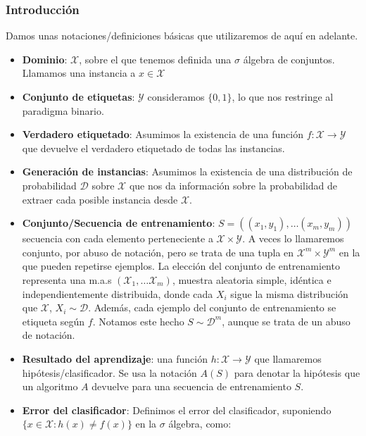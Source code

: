 \subsubsection{Introducción}

Damos unas notaciones/definiciones básicas que utilizaremos de aquí en adelante.

\begin{itemize}
\item \textbf{Dominio}: $\mathcal{X}$, sobre el que tenemos definida una $\sigma$ álgebra de conjuntos. Llamamos una instancia a $x\in \mathcal{X}$
\item \textbf{Conjunto de etiquetas}: $\mathcal{Y}$ consideramos $\{0,1\}$, lo que nos restringe al paradigma binario.
\item \textbf{Verdadero etiquetado}: Asumimos la existencia de una función $f: \mathcal{X} \rightarrow \mathcal{Y}$ que devuelve el verdadero etiquetado de todas las instancias.
\item \textbf{Generación de instancias}: Asumimos la existencia de una distribución de probabilidad $\mathcal{D}$ sobre $\mathcal{X}$ que nos da información sobre la probabilidad de extraer cada posible instancia desde $\mathcal{X}$.
\item \textbf{Conjunto/Secuencia de entrenamiento}: $S = ((x_1,y_1), \ldots (x_m, y_m))$ secuencia con cada elemento perteneciente a $\mathcal{X}\times \mathcal{Y}$. A veces lo llamaremos conjunto, por abuso de notación, pero se trata de una tupla en $\mathcal{X}^m \times \mathcal{Y}^m$ en la que pueden repetirse ejemplos. La elección del conjunto de entrenamiento representa una m.a.s $(\mathcal{X}_1,\ldots \mathcal{X}_m)$, muestra aleatoria simple, idéntica e independientemente distribuida, donde cada $X_i$ sigue la misma distribución que $\mathcal{X}$, $X_i \sim \mathcal{D}$. Además, cada ejemplo del conjunto de entrenamiento se etiqueta según $f$. Notamos este hecho $S \sim \mathcal{D}^m$, aunque se trata de un abuso de notación.
\item \textbf{Resultado del aprendizaje}: una función $h: \mathcal{X} \rightarrow \mathcal{Y}$ que llamaremos hipótesis/clasificador. Se usa la notación $A(S)$ para denotar la hipótesis que un algoritmo $A$ devuelve para una secuencia de entrenamiento $S$.
\item \textbf{Error del clasificador}: Definimos el error del clasificador, suponiendo $\{x\in \mathcal{X} : h(x) \neq f(x)\}$ en la $\sigma$ álgebra, como:
\end{itemize}

